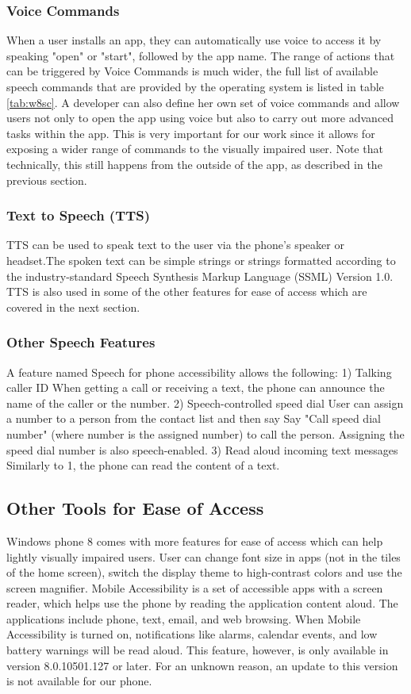 \subsubsection{Voice Commands}
When a user installs an app, they can automatically use voice to access it by speaking "open" or "start", followed by the app name. The range of actions that can be triggered by Voice Commands is much wider, the full list of available speech commands that are provided by the operating system is listed in table \ref{tab:w8sc}.
A developer can also define her own set of voice commands and allow users not only to open the app using voice but also to carry out more advanced tasks within the app. This is very important for our work since it allows for exposing a wider range of commands to the visually impaired user. Note that technically, this still happens from the outside of the app, as described in the previous section.

\subsubsection{Text to Speech (TTS)}
TTS can be used to speak text to the user via the phone's speaker or headset.The spoken text can be simple strings or strings formatted according to the industry-standard Speech Synthesis Markup Language (SSML) Version 1.0. TTS is also used in some of the other features for ease of access which are covered in the next section.

\subsubsection{Other Speech Features}
A feature named Speech for phone accessibility allows the following:
1)	Talking caller ID
When getting a call or receiving a text, the phone can announce the name of the caller or the number. 
2)	Speech-controlled speed dial
User can assign a number to a person from the contact list and then say Say "Call speed dial number" (where number is the assigned number) to call the person. Assigning the speed dial number is also speech-enabled.
3)	Read aloud incoming text messages
Similarly to 1, the phone can read the content of a text.

\subsection{Other Tools for Ease of Access}
Windows phone 8 comes with more features for ease of access which can help lightly visually impaired users. User can change font size in apps (not in the tiles of the home screen), switch the display theme to high-contrast colors and use the screen magnifier. Mobile Accessibility is a set of accessible apps with a screen reader, which helps use the phone by reading the application content aloud. The applications include phone, text, email, and web browsing. When Mobile Accessibility is turned on, notifications like alarms, calendar events, and low battery warnings will be read aloud. This feature, however, is only available in version 8.0.10501.127 or later. For an unknown reason, an update to this version is not available for our phone.

